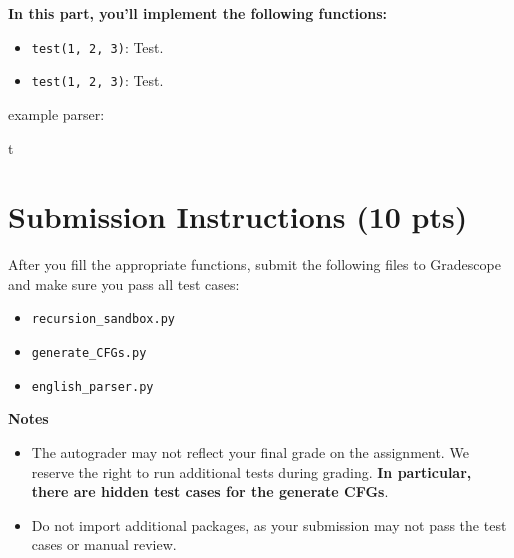 \documentclass{article}
\begin{document}
\begin{tcolorbox}[enhanced,interior style={top color=Dandelion!20,bottom color=Dandelion!30}]
    \textbf{In this part, you'll implement the following functions:}
    \begin{itemize}
        \item \lstinline{test(1, 2, 3)}: Test.
        \item \lstinline{test(1, 2, 3)}: Test.
    \end{itemize}
\end{tcolorbox}







example parser:



t
\section*{Submission Instructions (10 pts)}
    After you fill the appropriate functions, submit the following files to Gradescope and make sure you pass all test cases:
    \begin{itemize}
        \item \lstinline{recursion_sandbox.py}
        \item \lstinline{generate_CFGs.py}
        \item \lstinline{english_parser.py}
    \end{itemize}

    \vspace{3mm}
    \textbf{Notes}
    \begin{itemize}
        \item The autograder may not reflect your final grade on the assignment. We reserve the right to run additional tests during grading. \textbf{In particular, there are hidden test cases for the generate CFGs}.
        \item Do not import additional packages, as your submission may not pass the test cases or manual review.
    \end{itemize}
\end{document}
